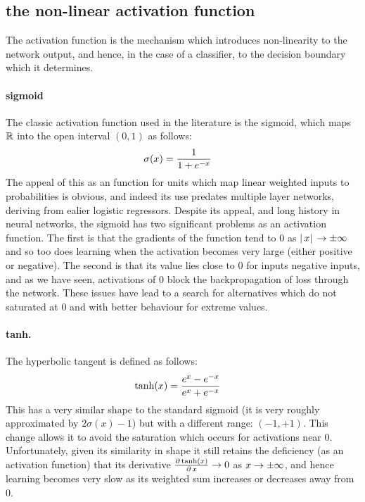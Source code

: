 \documentclass[msc]{infthesis}
\newcommand{\norm}[1]{\left\lvert\,{#1}\right\rvert}
\begin{document}
\subsection{the non-linear activation function}
\label{sec:classification:3-1}


The activation function is the mechanism which introduces non-linearity to the network output,
and hence, in the case of a classifier, to the decision boundary which it determines.


\paragraph*{sigmoid}
%
The classic activation function used in the literature is the sigmoid, which maps \(\mathbb{R}\) into
the open interval \((0,1)\) as follows:
%
\begin{align}
  \label{eq:sigmoid}
  \sigma( x )
  &=
  { 1 \over 1 + e^{-x} }
\end{align}
%
The appeal of this as an function for units which map linear weighted inputs to probabilities is
obvious, and indeed its use predates multiple layer networks, deriving from ealier logistic
regressors.
%
Despite its appeal, and long history in neural networks, the sigmoid has two significant
problems as an activation function.
%
The first is that the gradients of the function tend to 0
as \(\norm{x} \approaches \pm\infty\) and so too does learning when the activation becomes very
large (either positive or negative).
%
The second is that its value lies close to 0 for inputs
negative inputs, and as we have seen, activations of 0 block the backpropagation of loss through
the network.
%
These issues have lead to a search for alternatives which do not saturated at 0 and with better
behaviour for extreme values.


\paragraph*{tanh.}
%
The hyperbolic tangent is defined as follows:
%
\begin{align}
  \label{eq:tanh}
  \tanh(x) &= { {e^{x} - e^{-x}} \over { e^{x} + e^{-x}} }
\end{align}
%
This has a very similar shape to the standard sigmoid (it is very roughly approximated by \(2
\sigma(x) - 1\)) but with a different range: \((-1, +1)\).  This change allows it to avoid the
saturation which occurs for activations near 0. Unfortunately, given its similarity in shape it
still retains the deficiency (as an activation function) that its derivative
\(\derivative[\tanh(x)]{x} \approaches 0\) as \(x \approaches \pm\infty\), and hence learning
becomes very slow as its weighted sum increases or decreases away from 0.
\end{document}
